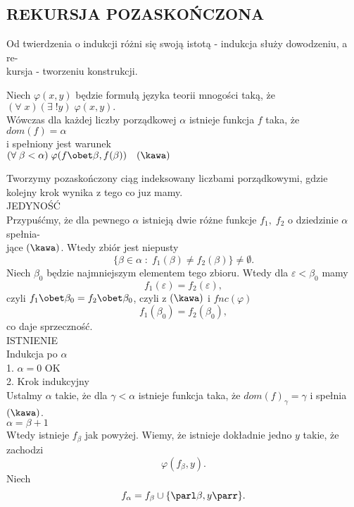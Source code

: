 \subsection{REKURSJA POZASKOŃCZONA}
Od twierdzenia o indukcji różni się swoją istotą - indukcja służy dowodzeniu, a re-\\kursja - tworzeniu konstrukcji.\bigskip
\begin{center}\large
    Niech $\varphi(x,y)$ będzie formułą języka teorii mnogości taką, że\smallskip\\
    $(\forall\;x)(\exists\;!y)\;\varphi(x,y).$\smallskip\\
    Wówczas dla każdej liczby porządkowej $\alpha$ istnieje funkcja $f$ taka, że\smallskip\\
    $dom(f)=\alpha$\smallskip\\
    i spełniony jest warunek\smallskip\\
    $(\forall\;\beta<\alpha)\;\varphi(f\obet\beta, f(\beta))\quad(\kawa)$
\end{center}
Tworzymy pozaskończony ciąg indeksowany liczbami porządkowymi, gdzie kolejny krok wynika z tego co juz mamy.\bigskip\\
\dowod
{\large\color{def}JEDYNOŚĆ}\medskip\\
Przypuśćmy, że dla pewnego $\alpha$ istnieją dwie różne funkcje $f_1,\;f_2$ o dziedzinie $\alpha$ spełnia-\\jące $(\kawa)$. Wtedy zbiór jest niepusty
$$\{\beta\in\alpha\;:\;f_1(\beta)\neq f_2(\beta)\}\neq\emptyset.$$
Niech $\beta_0$ będzie najmniejszym elementem tego zbioru. Wtedy dla $\varepsilon<\beta_0$ mamy
$$f_1(\varepsilon)=f_2(\varepsilon),$$
czyli $f_1\obet\beta_0=f_2\obet\beta_0$, czyli z $(\kawa)$ i $fnc(\varphi)$
$$f_1(\beta_0)=f_2(\beta_0),$$
co daje sprzeczność.\bigskip\\
{\large\color{def}ISTNIENIE}\medskip\\
Indukcja po $\alpha$\medskip\\
1. $\alpha=0$ OK\medskip\\
2. Krok indukcyjny\smallskip\\
Ustalmy $\alpha$ takie, że dla $\gamma<\alpha$ istnieje funkcja taka, że $dom(f)_\gamma=\gamma$ i spełnia $(\kawa)$.\smallskip\\
 $\alpha=\beta+1$\smallskip\\
Wtedy istnieje $f_\beta$ jak powyżej. Wiemy, że istnieje dokładnie jedno $y$ takie, że zachodzi
$$\varphi(f_\beta, y).$$
Niech 
$$f_\alpha=f_\beta\cup\{\parl\beta, y\parr\}.$$
